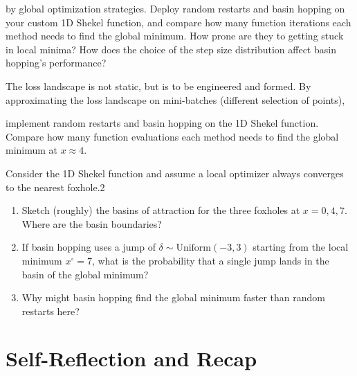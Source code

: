  by global optimization strategies. Deploy random restarts and basin hopping on your custom 1D Shekel function, 
and compare how many function iterations each method needs to find the global minimum. How prone are they to getting stuck in local minima? 
How does the choice of the step size distribution affect basin hopping's performance? 



 The loss landscape is not static, but is to be engineered and formed. By approximating the loss landscape on mini-batches (different selection of points),


 implement random restarts and basin hopping on the 1D Shekel function.
Compare how many function evaluations each method needs to find the global minimum at $x \approx 4$.




\vspace{2em}
 Consider the 1D Shekel function and assume a local optimizer always converges to the nearest foxhole.2

\begin{enumerate}[label=(\alph*)]
    \item Sketch (roughly) the basins of attraction for the three foxholes at $x = 0, 4, 7$. Where are the basin boundaries?
    \item If basin hopping uses a jump of $\delta \sim \text{Uniform}(-3, 3)$ starting from the local minimum $x^{\circ} = 7$,
    what is the probability that a single jump lands in the basin of the global minimum?
    \item Why might basin hopping find the global minimum faster than random restarts here?
\end{enumerate}






\section{Self-Reflection and Recap}


